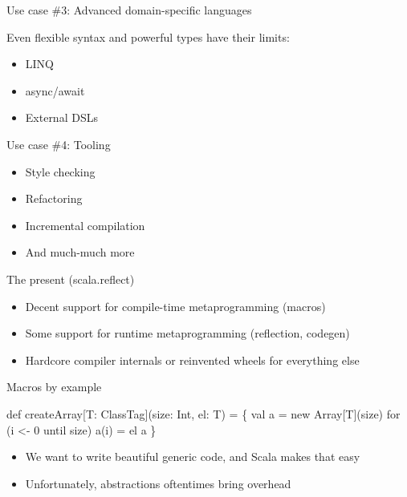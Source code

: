 \documentclass[svgnames,dvipsnames,hyperref={bookmarks=false},usepdftitle=false]{beamer}
\begin{document}
\begin{frame}{Use case \#3: Advanced domain-specific languages}

Even flexible syntax and powerful types have their limits:

\begin{itemize}
\item LINQ
\item async/await
\item External DSLs
\end{itemize}

\end{frame}

\begin{frame}{Use case \#4: Tooling}

\begin{itemize}
\item Style checking
\item Refactoring
\item Incremental compilation
\item And much-much more
\end{itemize}

\end{frame}


\begin{frame}{The present (scala.reflect)}

\begin{itemize}
\item Decent support for compile-time metaprogramming (macros)
\item Some support for runtime metaprogramming (reflection, codegen)
\item Hardcore compiler internals or reinvented wheels for everything else
\end{itemize}

\end{frame}

\begin{frame}[fragile]{Macros by example}

\begin{semiverbatim}
def createArray[T: ClassTag](size: Int, el: T) = \{
  val a = new Array[T](size)
  for (i <- 0 until size) a(i) = el
  a
\}

\end{semiverbatim}

\begin{itemize}
\item We want to write beautiful generic code, and Scala makes that easy
\item Unfortunately, abstractions oftentimes bring overhead
\end{itemize}
\end{frame}
\end{document}
